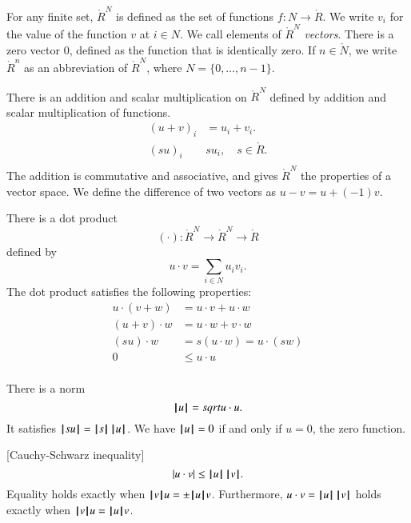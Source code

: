 For any finite set, $\ring{R}^N$ is defined as the set of functions
$f:N\to\ring{R}$. We write $v_i$ for the value of the function $v$ at $i\in N$.
We call elements of $\ring{R}^N$ {\it vectors}.
  There is a zero vector $0$, defined as the function that is identically zero.
If $n\in\ring{N}$, we write $\ring{R}^n$ as an abbreviation of $\ring{R}^N$,
where $N=\{0,\ldots,n-1\}$.

There is an addition and scalar multiplication on $\ring{R}^N$
defined by addition and scalar multiplication of functions.
    $$\begin{array}{lll}
    (u + v)_i &= u_i + v_i.\\
    (s u)_i & s u_i,\quad s\in\ring{R}.\\
    \end{array}
    $$
The addition is commutative and associative, and gives
$\ring{R}^N$ the properties of a vector space.
We define the difference of two vectors as $u - v = u + (-1) v$.

There is a dot product
$$(\cdot):\ring{R}^N\to\ring{R}^N\to\ring{R}$$ defined by
    $$u\cdot v = \sum_{i\in N} u_i v_i.$$
The dot product satisfies the following
properties:
    $$\begin{array}{lll}
        u \cdot (v + w) &= u \cdot v + u \cdot w\\
        (u + v)\cdot w &= u \cdot w + v \cdot w\\
        (s u)\cdot w &= s(u \cdot w) = u \cdot (s w)\\
        0 &\le u\cdot u\\
    \end{array}$$


There is a norm
$$\normo{u} = \sqrt{u\cdot u}.$$
It satisfies $\normo{ s u } = \normo{s} \, \normo{u}$.  We have $\normo{u}=0$  if and
only if $u=0$, the zero function.

\begin{lemma}[Cauchy-Schwarz inequality]
    $$|u \cdot v| \le \normo{u}\,\normo{v}.$$
Equality holds exactly when $\normo{v}u = \pm \normo{u}v$.  Furthermore,
$u\cdot v = \normo{u}\,\normo{v}$ holds exactly when $\normo{v} u = \normo{u} v$.
\end{lemma}

